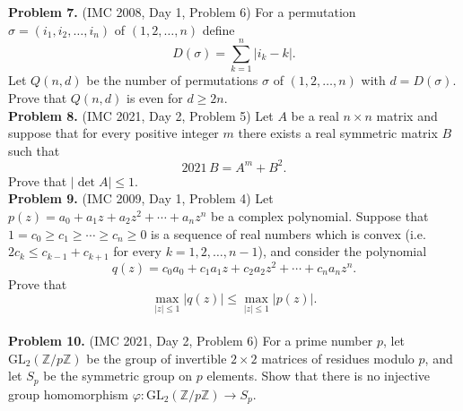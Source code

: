 \documentclass{article}
\newcommand{\Z}{\mathbb{Z}}
\begin{document}
\textbf{Problem 7.} (IMC 2008, Day 1, Problem 6)
For a permutation \( \sigma = (i_1, i_2, \ldots, i_n) \) of \( (1, 2, \ldots, n) \) define
\[
D(\sigma) = \sum_{k=1}^{n} |i_k - k|.
\]
Let \( Q(n, d) \) be the number of permutations \( \sigma \) of \( (1, 2, \ldots, n) \) with \( d = D(\sigma) \).
Prove that \( Q(n, d) \) is even for \( d \geq 2n \).
\\

\textbf{Problem 8.} (IMC 2021, Day 2, Problem 5)
Let \( A \) be a real \( n \times n \) matrix and suppose that for every positive integer \( m \) there exists a real symmetric matrix \( B \) such that
\[
2021\, B = A^m + B^2.
\]
Prove that \( |\det A| \leq 1 \).
\\

\textbf{Problem 9.} (IMC 2009, Day 1, Problem 4)
Let \( p(z) = a_0 + a_1 z + a_2 z^2 + \cdots + a_n z^n \) be a complex polynomial.
Suppose that \( 1 = c_0 \geq c_1 \geq \cdots \geq c_n \geq 0 \) is a sequence of real numbers which is convex
(i.e.\ \( 2 c_k \leq c_{k-1} + c_{k+1} \) for every \( k = 1, 2, \ldots, n - 1 \)), and consider the polynomial
\[
q(z) = c_0 a_0 + c_1 a_1 z + c_2 a_2 z^2 + \cdots + c_n a_n z^n.
\]
Prove that
\[
\max_{|z| \leq 1} |q(z)| \leq \max_{|z| \leq 1} |p(z)|.
\]
\\

\textbf{Problem 10.} (IMC 2021, Day 2, Problem 6)
For a prime number \( p \), let \( \mathrm{GL}_2(\Z / p\Z) \) be the group of invertible \( 2 \times 2 \) matrices of residues
modulo \( p \), and let \( S_p \) be the symmetric group on \( p \) elements.
Show that there is no injective group homomorphism \( \varphi : \mathrm{GL}_2(\Z / p\Z) \to S_p \).
\end{document}
